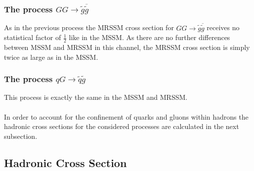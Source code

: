 \subsubsection*{The process $GG \to \tilde{g}\overline{\tilde{g}}$}
As in the previous process the MRSSM cross section for $GG \to \tilde{g}\overline{\tilde{g}}$ receives no statistical factor of $\frac{1}{2}$ like in the MSSM. As there are no further differences between MSSM and MRSSM in this channel, the MRSSM cross section is simply twice as large as in the MSSM.

\subsubsection*{The process $q G \to \tilde{q} \tilde{g}$}
This process is exactly the same in the MSSM and MRSSM.
\\ 
\\
In order to account for the confinement of quarks and gluons within hadrons the hadronic cross sections for the considered processes are calculated in the next subsection.



\subsection{Hadronic Cross Section}

